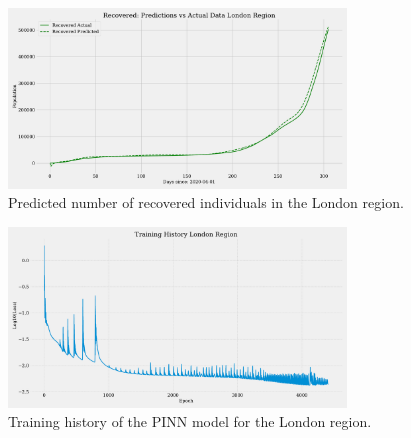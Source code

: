\documentclass[12pt]{article}
\begin{document}
\begin{figure}[ht]
    \centering
    \includegraphics[width=0.8\textwidth]{images/pinn/R_predictions_London Region.pdf}
    \caption{Predicted number of recovered individuals in the London region.}
    \label{fig:R_predictions_London}
\end{figure}

\begin{figure}[ht]
    \centering
    \includegraphics[width=0.8\textwidth]{images/pinn/Training_History_London Region.pdf}
    \caption{Training history of the PINN model for the London region.}
    \label{fig:Training_History_London}
\end{figure}




\end{document}
